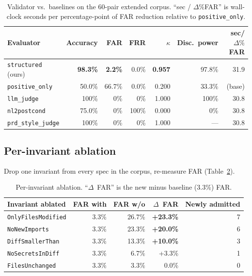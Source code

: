 \documentclass{article}
\begin{document}
\begin{table}[ht]
\centering
\caption{Validator vs.\ baselines on the 60-pair extended corpus. ``sec / $\Delta\%$FAR'' is wall-clock seconds per percentage-point of FAR reduction relative to \texttt{positive\_only}.}
\label{tab:validator}
\begin{tabular}{lrrrrrr}
\toprule
Evaluator & Accuracy & FAR & FRR & $\kappa$ & Disc.\ power & sec/$\Delta\%$FAR \\
\midrule
\texttt{structured} (ours)  & \textbf{98.3\%} & \textbf{2.2\%} & 0.0\% & \textbf{0.957} & 97.8\% & 31.9 \\
\texttt{positive\_only}    & 50.0\% & 66.7\% & 0.0\% & 0.200 & 33.3\% & (base) \\
\texttt{llm\_judge}        & 100\% & 0\% & 0\% & 1.000 & 100\% & 30.8 \\
\texttt{nl2postcond}       & 75.0\% & 0\% & 100\% & 0.000 & 0\% & 30.8 \\
\texttt{prd\_style\_judge} & 100\% & 0\% & 0\% & 1.000 & --- & 30.8 \\
\bottomrule
\end{tabular}
\end{table}

\subsection{Per-invariant ablation}

Drop one invariant from every spec in the corpus, re-measure FAR (Table~\ref{tab:ablation}).

\begin{table}[ht]
\centering
\caption{Per-invariant ablation. ``$\Delta$~FAR'' is the new minus baseline (3.3\%) FAR.}
\label{tab:ablation}
\begin{tabular}{lrrrr}
\toprule
Invariant ablated & FAR with & FAR w/o & $\Delta$~FAR & Newly admitted \\
\midrule
\texttt{OnlyFilesModified} & 3.3\% & 26.7\% & \textbf{+23.3\%} & 7 \\
\texttt{NoNewImports}      & 3.3\% & 23.3\% & \textbf{+20.0\%} & 6 \\
\texttt{DiffSmallerThan}   & 3.3\% & 13.3\% & \textbf{+10.0\%} & 3 \\
\texttt{NoSecretsInDiff}   & 3.3\% & 6.7\%  & +3.3\%  & 1 \\
\texttt{FilesUnchanged}    & 3.3\% & 3.3\%  & 0.0\%   & 0 \\
\bottomrule
\end{tabular}
\end{table}
\end{document}
